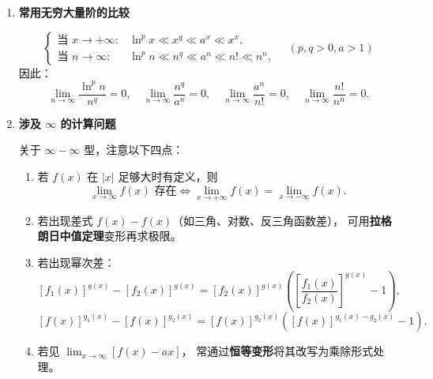 \begin{enumerate}
\begin{enumerate}
              \item \textbf{带头大哥型：}

                    若 $\alpha=o(\beta)$，则
                    \[
                        \textcircled{1}\ \alpha+\beta\sim\beta, \qquad
                        \textcircled{2}\ \alpha+\beta\text{ 与 }\beta\text{同号}, \qquad
                        \textcircled{3}\ \alpha\beta=o(\beta^2).
                    \]
          \end{enumerate}

    \item \textbf{常用无穷大量阶的比较}

          \[
              \begin{cases}
                  \text{当 }x\to+\infty: & \ln^p x \ll x^q \ll a^x \ll x^x,        \\[4pt]
                  \text{当 }n\to\infty:  & \ln^p n \ll n^q \ll a^n \ll n! \ll n^n,
              \end{cases}\quad (p,q>0,a>1)
          \]
          因此：
          \[
              \lim_{n\to\infty}\frac{\ln^p n}{n^q}=0,\quad
              \lim_{n\to\infty}\frac{n^q}{a^n}=0,\quad
              \lim_{n\to\infty}\frac{a^n}{n!}=0,\quad
              \lim_{n\to\infty}\frac{n!}{n^n}=0.
          \]

    \item \textbf{涉及 $\infty$ 的计算问题}

          关于 $\infty-\infty$ 型，注意以下四点：

          \begin{enumerate}
              \item 若 $f(x)$ 在 $|x|$ 足够大时有定义，则
                    \[
                        \lim_{x\to\infty}f(x) \text{ 存在}
                        \iff
                        \lim_{x\to+\infty}f(x) = \lim_{x\to-\infty}f(x).
                    \]

              \item 若出现差式 $f(x)-f(x)$（如三角、对数、反三角函数差），
                    可用\textbf{拉格朗日中值定理}变形再求极限。

              \item 若出现幂次差：
                    \[
                        [f_1(x)]^{g(x)}-[f_2(x)]^{g(x)} = [f_2(x)]^{g(x)}
                        \left(\left[\frac{f_1(x)}{f_2(x)}\right]^{g(x)}-1\right),
                    \]
                    \[
                        [f(x)]^{g_1(x)}-[f(x)]^{g_2(x)} = [f(x)]^{g_2(x)}
                        \left([f(x)]^{g_1(x)-g_2(x)}-1\right).
                    \]

              \item 若见 $\lim_{x\to\infty}[f(x)-ax]$，
                    常通过\textbf{恒等变形}将其改写为乘除形式处理。
          \end{enumerate}
\end{enumerate}

